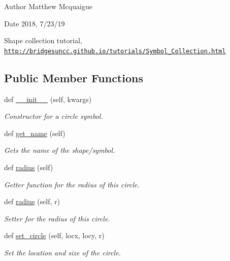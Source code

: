 \begin{DoxyAuthor}{Author}
Matthew Mcquaigue 
\end{DoxyAuthor}
\begin{DoxyDate}{Date}
2018, 7/23/19
\end{DoxyDate}
Shape collection tutorial, \href{http://bridgesuncc.github.io/tutorials/Symbol_Collection.html}{\tt http\+://bridgesuncc.\+github.\+io/tutorials/\+Symbol\+\_\+\+Collection.\+html} \subsection*{Public Member Functions}
\begin{DoxyCompactItemize}
\item 
def \mbox{\hyperlink{classbridges_1_1circle_1_1_circle_a04dfb68bb632534cf715e2ce927cc76a}{\+\_\+\+\_\+init\+\_\+\+\_\+}} (self, kwargs)
\begin{DoxyCompactList}\small\item\em Constructor for a circle symbol. \end{DoxyCompactList}\item 
def \mbox{\hyperlink{classbridges_1_1circle_1_1_circle_acacc4d8cc5f2db86cfcba61f31652003}{get\+\_\+name}} (self)
\begin{DoxyCompactList}\small\item\em Gets the name of the shape/symbol. \end{DoxyCompactList}\item 
def \mbox{\hyperlink{classbridges_1_1circle_1_1_circle_abc82c7f3e8ac6112167b396839863319}{radius}} (self)
\begin{DoxyCompactList}\small\item\em Getter function for the radius of this circle. \end{DoxyCompactList}\item 
def \mbox{\hyperlink{classbridges_1_1circle_1_1_circle_ae7c2dc54c90d954626f99d7561009587}{radius}} (self, r)
\begin{DoxyCompactList}\small\item\em Setter for the radius of this circle. \end{DoxyCompactList}\item 
def \mbox{\hyperlink{classbridges_1_1circle_1_1_circle_a42b7ccd17017ca328371ce27e1bdbffe}{set\+\_\+circle}} (self, locx, locy, r)
\begin{DoxyCompactList}\small\item\em Set the location and size of the circle. \end{DoxyCompactList}\item 

\end{DoxyCompactItemize}
